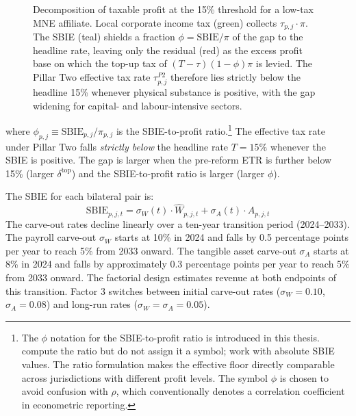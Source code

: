 \documentclass[11pt,a4paper]{article}
\begin{document}
\begin{figure}[H]
\caption[Effective Pillar Two tax floor.]{Decomposition of taxable profit at the 15\% threshold for a low-tax MNE affiliate. Local corporate income tax (green) collects $\tau_{p,j}\cdot\pi$. The SBIE (teal) shields a fraction $\phi=\text{SBIE}/\pi$ of the gap to the headline rate, leaving only the residual (red) as the excess profit base on which the top-up tax of $(T-\tau)(1-\phi)\pi$ is levied. The Pillar Two effective tax rate $\tau^{P2}_{p,j}$ therefore lies strictly below the headline 15\% whenever physical substance is positive, with the gap widening for capital- and labour-intensive sectors.}
\label{fig:effective_floor}
\end{figure}

where $\phi_{p,j} \equiv \text{SBIE}_{p,j} / \pi_{p,j}$ is the SBIE-to-profit ratio.\footnote{The $\phi$ notation for the SBIE-to-profit ratio is introduced in this thesis. \citet{devereux2023} compute the ratio but do not assign it a symbol; \citet{schjelderup2024} work with absolute SBIE values. The ratio formulation makes the effective floor directly comparable across jurisdictions with different profit levels. The symbol $\phi$ is chosen to avoid confusion with $\rho$, which conventionally denotes a correlation coefficient in econometric reporting.} The effective tax rate under Pillar Two falls \emph{strictly below} the headline rate $T = 15\%$ whenever the SBIE is positive. The gap is larger when the pre-reform ETR is further below 15\% (larger $\delta^{\text{top}}$) and the SBIE-to-profit ratio is larger (larger $\phi$).

The SBIE for each bilateral pair is:
\begin{equation}\label{eq:sbie}
\text{SBIE}_{p,j,t} = \sigma_W(t) \cdot \hat{W}_{p,j,t} + \sigma_A(t) \cdot A_{p,j,t}
\end{equation}
The carve-out rates decline linearly over a ten-year transition period (2024--2033). The payroll carve-out $\sigma_W$ starts at 10\% in 2024 and falls by 0.5 percentage points per year to reach 5\% from 2033 onward. The tangible asset carve-out $\sigma_A$ starts at 8\% in 2024 and falls by approximately 0.3 percentage points per year to reach 5\% from 2033 onward. The factorial design estimates revenue at both endpoints of this transition. Factor 3 switches between initial carve-out rates ($\sigma_W = 0.10$, $\sigma_A = 0.08$) and long-run rates ($\sigma_W = \sigma_A = 0.05$).
\end{document}

